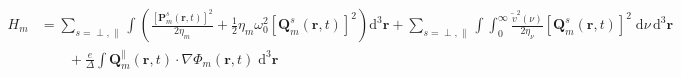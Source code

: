 \documentclass{article}
\begin{document}
\begin{equation}\label{eq:Hm2}
\begin{split}
H_m &= \sum_{s = \perp,\parallel}\int\left(\frac{\left[\mathbf{P}_m^s(\mathbf{r},t)\right]^2}{2\eta_m} + \frac{1}{2}\eta_m\omega_0^2\left[\mathbf{Q}_m^s(\mathbf{r},t)\right]^2\right)\mathrm{d}^3\mathbf{r} + \sum_{s = \perp,\parallel}\int\int_0^\infty\frac{\tilde{v}^2(\nu)}{2\eta_\nu}\left[\mathbf{Q}_m^s(\mathbf{r},t)\right]^2\;\mathrm{d}\nu\,\mathrm{d}^3\mathbf{r}\\
&\qquad+ \frac{e}{\Delta}\int\mathbf{Q}_m^\parallel(\mathbf{r},t)\cdot\nabla\Phi_m(\mathbf{r},t)\;\mathrm{d}^3\mathbf{r}\\

\end{split}
\end{equation}
\end{document}
